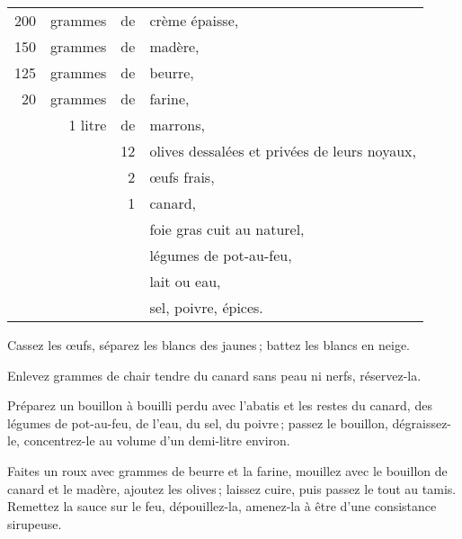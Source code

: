 \footnotesize
\begin{longtable}{rrrp{16em}}
    200 & grammes & de & crème épaisse,                                                                   \\
    150 & grammes & de & madère,                                                                          \\
    125 & grammes & de & beurre,                                                                          \\
     20 & grammes & de & farine,                                                                          \\
        & 1 litre & de & marrons,                                                                         \\
        &         & 12 & olives dessalées et privées de leurs noyaux,                                     \\
        &         &  2 & œufs frais,                                                                      \\
        &         &  1 & canard,                                                                          \\
        &         &    & foie gras cuit au naturel,                                                       \\
        &         &    & légumes de pot-au-feu,                                                           \\
        &         &    & lait ou eau,                                                                     \\
        &         &    & sel, poivre, épices.                                                             \\
\end{longtable}
\normalsize

Cassez les œufs, séparez les blancs des jaunes ; battez les blancs en neige.

Enlevez {\mmm} grammes de chair tendre du canard sans peau ni nerfs,
réservez-la.

Préparez un bouillon à bouilli perdu avec l'abatis et les restes du canard, des
légumes de pot-au-feu, de l’eau, du sel, du poivre ; passez le bouillon,
dégraissez-le, concentrez-le au volume d’un demi-litre environ.

Faites un roux avec {\mmm} grammes de beurre et la farine, mouillez
avec le bouillon de canard et le madère, ajoutez les olives ; laissez cuire,
puis passez le tout au tamis. Remettez la sauce sur le feu, dépouillez-la,
amenez-la à être d'une consistance sirupeuse.

